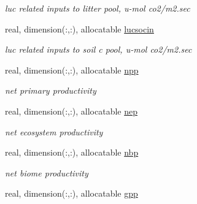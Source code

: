 \begin{DoxyCompactItemize}
\begin{DoxyCompactList}\small\item\em luc related inputs to litter pool, u-\/mol co2/m2.\+sec \end{DoxyCompactList}\item 
\hypertarget{structctem__statevars_1_1veg__rot_a8abbde4c483ab277f0cb371586f7e2dc}{}real, dimension(\+:,\+:), allocatable \hyperlink{structctem__statevars_1_1veg__rot_a8abbde4c483ab277f0cb371586f7e2dc}{lucsocin}\label{structctem__statevars_1_1veg__rot_a8abbde4c483ab277f0cb371586f7e2dc}

\begin{DoxyCompactList}\small\item\em luc related inputs to soil c pool, u-\/mol co2/m2.\+sec \end{DoxyCompactList}\item 
\hypertarget{structctem__statevars_1_1veg__rot_a57027cc54547a5f80ef02e6a1b8384fc}{}real, dimension(\+:,\+:), allocatable \hyperlink{structctem__statevars_1_1veg__rot_a57027cc54547a5f80ef02e6a1b8384fc}{npp}\label{structctem__statevars_1_1veg__rot_a57027cc54547a5f80ef02e6a1b8384fc}

\begin{DoxyCompactList}\small\item\em net primary productivity \end{DoxyCompactList}\item 
\hypertarget{structctem__statevars_1_1veg__rot_a1b8dada944cba901cde3e99fc29b1d26}{}real, dimension(\+:,\+:), allocatable \hyperlink{structctem__statevars_1_1veg__rot_a1b8dada944cba901cde3e99fc29b1d26}{nep}\label{structctem__statevars_1_1veg__rot_a1b8dada944cba901cde3e99fc29b1d26}

\begin{DoxyCompactList}\small\item\em net ecosystem productivity \end{DoxyCompactList}\item 
\hypertarget{structctem__statevars_1_1veg__rot_aa30c8da63cfcbd31b3ab76f43983e7e9}{}real, dimension(\+:,\+:), allocatable \hyperlink{structctem__statevars_1_1veg__rot_aa30c8da63cfcbd31b3ab76f43983e7e9}{nbp}\label{structctem__statevars_1_1veg__rot_aa30c8da63cfcbd31b3ab76f43983e7e9}

\begin{DoxyCompactList}\small\item\em net biome productivity \end{DoxyCompactList}\item 
\hypertarget{structctem__statevars_1_1veg__rot_ab06b166cfbb23ef524c6f0ff8a7bcd41}{}real, dimension(\+:,\+:), allocatable \hyperlink{structctem__statevars_1_1veg__rot_ab06b166cfbb23ef524c6f0ff8a7bcd41}{gpp}\label{structctem__statevars_1_1veg__rot_ab06b166cfbb23ef524c6f0ff8a7bcd41}


\end{DoxyCompactItemize}
